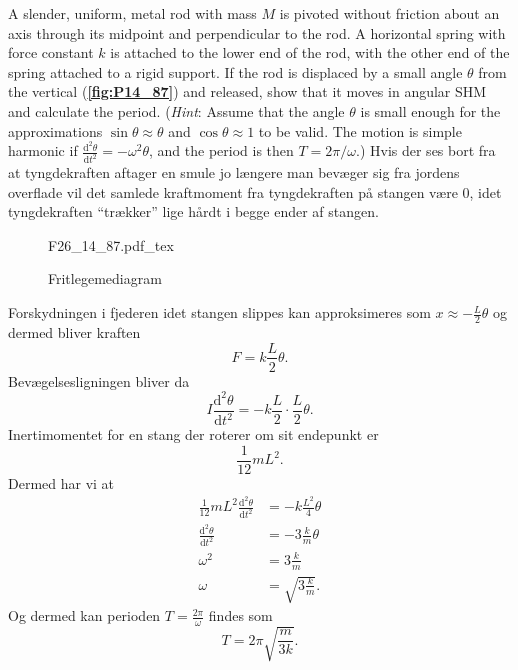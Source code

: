 \documentclass[12pt]{article}
\newcommand{\incfig}[2][1]{%
  \def\svgwidth{#1\columnwidth}
  {#2.pdf_tex}
}
\theoremstyle{definition}
\begin{document}
A slender, uniform, metal rod with mass $M$ is pivoted without friction about an axis through its midpoint and perpendicular to the rod. A horizontal spring with force constant $k$ is attached to the lower end of the rod, with the other end of the spring attached to a rigid support. If the rod is displaced by a small angle $\theta$ from the vertical (\textbf{\autoref{fig:P14_87}}) and released, show that it moves in angular SHM and calculate the period. (\textit{Hint}: Assume that the angle $\theta$ is small enough for the approximations $\sin \theta \approx\theta$ and $\cos \theta \approx 1$ to be valid. The motion is simple harmonic if $\frac{\mathrm{d}^2 \theta}{\mathrm{d}t^2} = - \omega^2 \theta$, and the period is then $T = 2\pi / \omega$.)
\bigbreak
Hvis der ses bort fra at tyngdekraften aftager en smule jo længere man bevæger sig fra jordens overflade vil det samlede kraftmoment fra tyngdekraften på stangen være 0, idet tyngdekraften ``trækker'' lige hårdt i begge ender af stangen.
\begin{figure}[ht]
  \centering
  \incfig[0.5]{F26_14_87}
  \caption{Fritlegemediagram}
  \label{fig:F26_14_87}
\end{figure}
Forskydningen i fjederen idet stangen slippes kan approksimeres som $x \approx -\frac{L}{2}\theta$ og dermed bliver kraften
\[ 
F = k \frac{L}{2}\theta
.\]
Bevægelsesligningen bliver da
\[ 
I \frac{\mathrm{d}^2 \theta}{\mathrm{d}t^2} = - k \frac{L}{2} \cdot \frac{L}{2} \theta
.\]
Inertimomentet for en stang der roterer om sit endepunkt er
\[ 
\frac{1}{12}mL^2
.\]
Dermed har vi at
\begin{align*}
  \frac{1}{12}mL^2 \frac{\mathrm{d}^2 \theta}{\mathrm{d}t^2} &= - k \frac{L^2}{4}\theta \\
  \frac{\mathrm{d}^2 \theta}{\mathrm{d}t^2} &= -3\frac{k}{m} \theta \\
  \omega^2 &= 3 \frac{k}{m} \\
  \omega &= \sqrt{3 \frac{k}{m}}
.\end{align*}
Og dermed kan perioden $T = \frac{2\pi}{\omega}$ findes som
\[ 
T = 2\pi \sqrt{\frac{m}{3k}}
.\]
\end{document}
